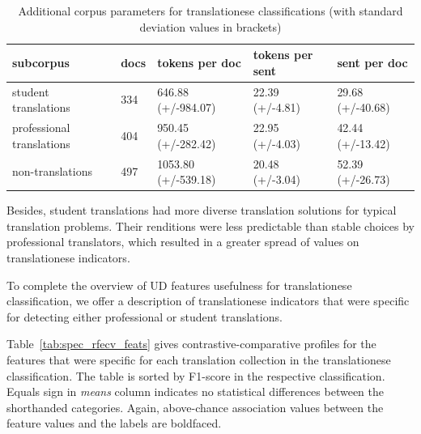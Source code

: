 \begin{table}[H]
	\begin{tabular}{l|llll}
			\toprule
			subcorpus                 & docs & tokens per doc   & tokens per sent & sent per doc  \\
			\midrule
			student translations      & 334  & 646.88 (+/-984.07)  & 22.39 (+/-4.81)    & 29.68 (+/-40.68) \\
			professional translations & 404  & 950.45 (+/-282.42)  & 22.95 (+/-4.03)    & 42.44 (+/-13.42) \\
			non-translations          & 497  & 1053.80 (+/-539.18) & 20.48 (+/-3.04)    & 52.39 (+/-26.73) \\
			\bottomrule
		\end{tabular}
 \caption{\label{tab:corpus_means}Additional corpus parameters for translationese classifications (with standard deviation values in brackets)}
\end{table}

Besides, student translations had more diverse translation solutions for typical translation problems. Their renditions were less predictable than stable choices by professional translators, which resulted in a greater spread of values on translationese indicators. 



To complete the overview of UD features usefulness for translationese classification, we offer a description of translationese indicators that were specific for detecting either professional or student translations.  

Table~\ref{tab:spec_rfecv_feats} gives contrastive-comparative profiles for the features that were specific for each translation collection in the translationese classification. The table is sorted by F1-score in the respective classification. Equals sign in \textit{means} column indicates no statistical differences between the shorthanded categories. Again, above-chance association values between the feature values and the labels are boldfaced.

